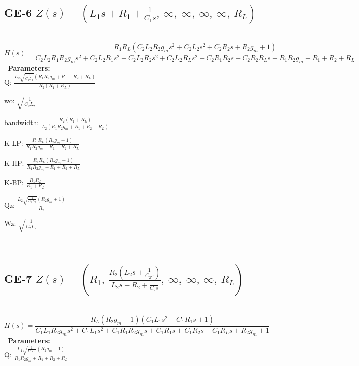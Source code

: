 \documentclass{article}
\begin{document}
\ 

\subsection{GE-6 $Z(s) = \left( L_{1} s + R_{1} + \frac{1}{C_{1} s}, \  \infty, \  \infty, \  \infty, \  \infty, \  R_{L}\right)$ } \ 
\textbf{\[H(s) = \frac{R_{1} R_{L} \left(C_{2} L_{2} R_{2} g_{m} s^{2} + C_{2} L_{2} s^{2} + C_{2} R_{2} s + R_{2} g_{m} + 1\right)}{C_{2} L_{2} R_{1} R_{2} g_{m} s^{2} + C_{2} L_{2} R_{1} s^{2} + C_{2} L_{2} R_{2} s^{2} + C_{2} L_{2} R_{L} s^{2} + C_{2} R_{1} R_{2} s + C_{2} R_{2} R_{L} s + R_{1} R_{2} g_{m} + R_{1} + R_{2} + R_{L}}\] } \ 
\textbf{Parameters:}\\ 

Q: $\frac{L_{2} \sqrt{\frac{1}{C_{2} L_{2}}} \left(R_{1} R_{2} g_{m} + R_{1} + R_{2} + R_{L}\right)}{R_{2} \left(R_{1} + R_{L}\right)}$\ 

wo: $\sqrt{\frac{1}{C_{2} L_{2}}}$\ 

bandwidth: $\frac{R_{2} \left(R_{1} + R_{L}\right)}{L_{2} \left(R_{1} R_{2} g_{m} + R_{1} + R_{2} + R_{L}\right)}$\ 

K-LP: $\frac{R_{1} R_{L} \left(R_{2} g_{m} + 1\right)}{R_{1} R_{2} g_{m} + R_{1} + R_{2} + R_{L}}$\ 

K-HP: $\frac{R_{1} R_{L} \left(R_{2} g_{m} + 1\right)}{R_{1} R_{2} g_{m} + R_{1} + R_{2} + R_{L}}$\ 

K-BP: $\frac{R_{1} R_{L}}{R_{1} + R_{L}}$\ 

Qz: $\frac{L_{2} \sqrt{\frac{1}{C_{2} L_{2}}} \left(R_{2} g_{m} + 1\right)}{R_{2}}$\ 

Wz: $\sqrt{\frac{1}{C_{2} L_{2}}}$\ 

\ 

\subsection{GE-7 $Z(s) = \left( R_{1}, \  \frac{R_{2} \left(L_{2} s + \frac{1}{C_{2} s}\right)}{L_{2} s + R_{2} + \frac{1}{C_{2} s}}, \  \infty, \  \infty, \  \infty, \  R_{L}\right)$ } \ 
\textbf{\[H(s) = \frac{R_{L} \left(R_{2} g_{m} + 1\right) \left(C_{1} L_{1} s^{2} + C_{1} R_{1} s + 1\right)}{C_{1} L_{1} R_{2} g_{m} s^{2} + C_{1} L_{1} s^{2} + C_{1} R_{1} R_{2} g_{m} s + C_{1} R_{1} s + C_{1} R_{2} s + C_{1} R_{L} s + R_{2} g_{m} + 1}\] } \ 
\textbf{Parameters:}\\ 

Q: $\frac{L_{1} \sqrt{\frac{1}{C_{1} L_{1}}} \left(R_{2} g_{m} + 1\right)}{R_{1} R_{2} g_{m} + R_{1} + R_{2} + R_{L}}$\ 
\end{document}
